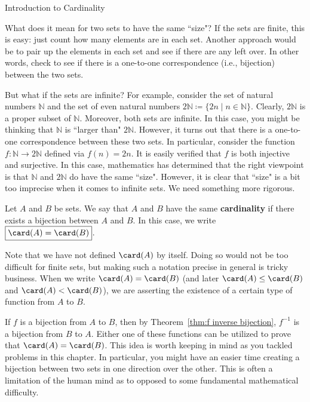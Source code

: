 \begin{section}{Introduction to Cardinality}

What does it mean for two sets to have the same ``size"?  If the sets are finite, this is easy: just count how many elements are in each set.  Another approach would be to pair up the elements in each set and see if there are any left over.  In other words, check to see if there is a one-to-one correspondence (i.e., bijection) between the two sets.  

But what if the sets are infinite?  For example, consider the set of natural numbers $\mathbb{N}$ and the set of even natural numbers $2\mathbb{N}\coloneqq \{2n\mid n\in \mathbb{N}\}$. Clearly, $2\mathbb{N}$ is a proper subset of $\mathbb{N}$.  Moreover, both sets are infinite.  In this case, you might be thinking that $\mathbb{N}$ is ``larger than" $2\mathbb{N}$.  However, it turns out that there is a one-to-one correspondence between these two sets.  In particular, consider the function $f:\mathbb{N}\to 2\mathbb{N}$ defined via $f(n)=2n$.  It is easily verified that $f$ is both injective and surjective.  In this case, mathematics has determined that the right viewpoint is that $\mathbb{N}$ and $2\mathbb{N}$ do have the same ``size". However, it is clear that ``size" is a bit too imprecise when it comes to infinite sets. We need something more rigorous.

\begin{definition}
Let $A$ and $B$ be sets. We say that $A$ and $B$ have the same \textbf{cardinality} if there exists a bijection between $A$ and $B$. In this case, we write $\boxed{\card(A)=\card(B)}$.
\end{definition}

Note that we have not defined $\card(A)$ by itself. Doing so would not be too difficult for finite sets, but making such a notation precise in general is tricky business.  When we write $\card(A)=\card(B)$ (and later $\card(A)\leq \card(B)$ and $\card(A)<\card(B)$), we are asserting the existence of a certain type of function from $A$ to $B$.

If $f$ is a bijection from $A$ to $B$, then by Theorem~\ref{thm:f inverse bijection}, $f^{-1}$ is a bijection from $B$ to $A$.  Either one of these functions can be utilized to prove that $\card(A)=\card(B)$.  This idea is worth keeping in mind as you tackled problems in this chapter.  In particular, you might have an easier time creating a bijection between two sets in one direction over the other. This is often a limitation of the human mind as to opposed to some fundamental mathematical difficulty.


\end{section}
